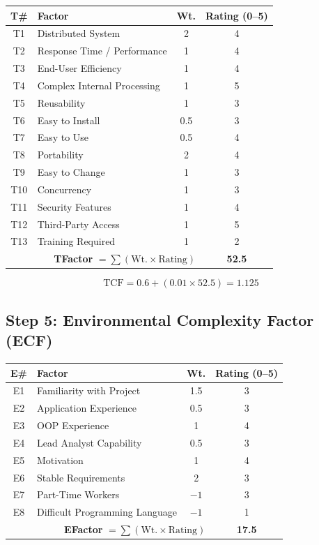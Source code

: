 \documentclass[12pt,a4paper]{article}
\begin{document}
\begin{center}
\begin{tabular}{clcc}
\toprule
\textbf{T\#} & \textbf{Factor} & \textbf{Wt.} & \textbf{Rating (0--5)} \\
\midrule
T1 & Distributed System & 2 & 4 \\
T2 & Response Time / Performance & 1 & 4 \\
T3 & End-User Efficiency & 1 & 4 \\
T4 & Complex Internal Processing & 1 & 5 \\
T5 & Reusability & 1 & 3 \\
T6 & Easy to Install & 0.5 & 3 \\
T7 & Easy to Use & 0.5 & 4 \\
T8 & Portability & 2 & 4 \\
T9 & Easy to Change & 1 & 3 \\
T10 & Concurrency & 1 & 3 \\
T11 & Security Features & 1 & 4 \\
T12 & Third-Party Access & 1 & 5 \\
T13 & Training Required & 1 & 2 \\
\midrule
\multicolumn{3}{r}{\textbf{TFactor} $= \sum(\text{Wt.} \times \text{Rating})$} & \textbf{52.5} \\
\bottomrule
\end{tabular}
\end{center}

\[
\text{TCF} = 0.6 + (0.01 \times 52.5) = \mathbf{1.125}
\]

\subsection{Step 5: Environmental Complexity Factor (ECF)}

\begin{center}
\begin{tabular}{clcc}
\toprule
\textbf{E\#} & \textbf{Factor} & \textbf{Wt.} & \textbf{Rating (0--5)} \\
\midrule
E1 & Familiarity with Project & 1.5 & 3 \\
E2 & Application Experience & 0.5 & 3 \\
E3 & OOP Experience & 1 & 4 \\
E4 & Lead Analyst Capability & 0.5 & 3 \\
E5 & Motivation & 1 & 4 \\
E6 & Stable Requirements & 2 & 3 \\
E7 & Part-Time Workers & $-1$ & 3 \\
E8 & Difficult Programming Language & $-1$ & 1 \\
\midrule
\multicolumn{3}{r}{\textbf{EFactor} $= \sum(\text{Wt.} \times \text{Rating})$} & \textbf{17.5} \\
\bottomrule
\end{tabular}
\end{center}
\end{document}
